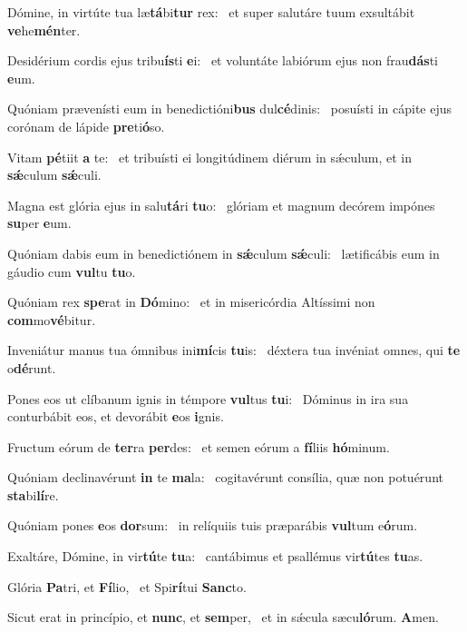 \item Dómine, in virtúte tua læ\textbf{tá}bi\textbf{tur} rex:~\psstar{} et super salutáre tuum exsultábit \textbf{ve}he\textbf{mén}ter.
\item Desidérium cordis ejus tribu\textbf{ís}ti \textbf{e}i:~\psstar{} et voluntáte labiórum ejus non frau\textbf{dás}ti \textbf{e}um.
\item Quóniam prævenísti eum in benedictióni\textbf{bus} dul\textbf{cé}dinis:~\psstar{} posuísti in cápite ejus corónam de lápide \textbf{pre}ti\textbf{ó}so.
\item Vitam \textbf{pé}tiit \textbf{a} te:~\psstar{} et tribuísti ei longitúdinem diérum in sǽculum, et in \textbf{sǽ}culum \textbf{sǽ}culi.
\item Magna est glória ejus in salu\textbf{tá}ri \textbf{tu}o:~\psstar{} glóriam et magnum decórem impónes \textbf{su}per \textbf{e}um.
\item Quóniam dabis eum in benedictiónem in \textbf{sǽ}culum \textbf{sǽ}culi:~\psstar{} lætificábis eum in gáudio cum \textbf{vul}tu \textbf{tu}o.
\item Quóniam rex \textbf{spe}rat in \textbf{Dó}mino:~\psstar{} et in misericórdia Altíssimi non \textbf{com}mo\textbf{vé}bitur.
\item Inveniátur manus tua ómnibus ini\textbf{mí}cis \textbf{tu}is:~\psstar{} déxtera tua invéniat omnes, qui \textbf{te} o\textbf{dé}runt.
\item Pones eos ut clíbanum ignis in témpore \textbf{vul}tus \textbf{tu}i:~\psstar{} Dóminus in ira sua conturbábit eos, et devorábit \textbf{e}os \textbf{i}gnis.
\item Fructum eórum de \textbf{ter}ra \textbf{per}des:~\psstar{} et semen eórum a \textbf{fí}liis \textbf{hó}minum.
\item Quóniam declinavérunt \textbf{in} te \textbf{ma}la:~\psstar{} cogitavérunt consília, quæ non potuérunt \textbf{sta}bi\textbf{lí}re.
\item Quóniam pones \textbf{e}os \textbf{dor}sum:~\psstar{} in relíquiis tuis præparábis \textbf{vul}tum e\textbf{ó}rum.
\item Exaltáre, Dómine, in vir\textbf{tú}te \textbf{tu}a:~\psstar{} cantábimus et psallémus vir\textbf{tú}tes \textbf{tu}as.
\item Glória \textbf{Pa}tri, et \textbf{Fí}lio,~\psstar{} et Spi\textbf{rí}tui \textbf{Sanc}to.
\item Sicut erat in princípio, et \textbf{nunc}, et \textbf{sem}per,~\psstar{} et in sǽcula sæcu\textbf{ló}rum. \textbf{A}men.
